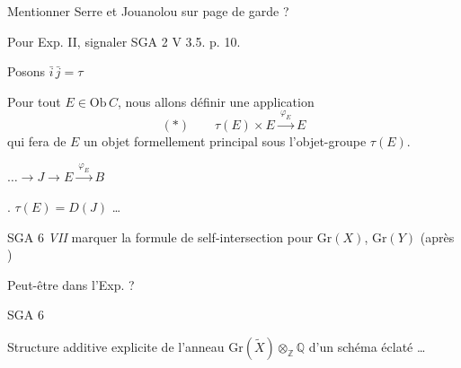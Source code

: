 \documentclass[11pt,a4paper]{article}
\begin{document}
Mentionner Serre et Jouanolou sur page de garde ?



Pour Exp. II,  signaler SGA 2 V 3.5. p. 10.



Posons \quad $\bar{i}\,\bar{j} = \tau$

Pour tout $E \in \mathrm{Ob}\,C$, nous allons définir une application
\[
(*) \qquad \tau(E) \times E \xrightarrow{\ \varphi_E\ } E
\]
qui fera de $E$ un objet formellement principal sous l'objet-groupe $\tau(E)$.
 \add{\ill{}}

 \ill{} \struck{\ill{}} $\ldots \to J \to E \xrightarrow{\ \varphi_E\ } B$

\ill{} \ill{}. \quad $\tau(E) = D$\ill{}$(J)$ \ldots



SGA 6 \emph{VII} \quad marquer la formule de self-intersection pour
$\mathrm{Gr}(X)$, $\mathrm{Gr}(Y)$ (après \struck{\ill{}} )

Peut-être  dans l'Exp. ?



SGA 6

Structure additive explicite de l'anneau $\mathrm{Gr}(\tilde{X}) \otimes_{\mathbb{Z}}
\mathbb{Q}$ d'un schéma éclaté \ldots{}
\end{document}
